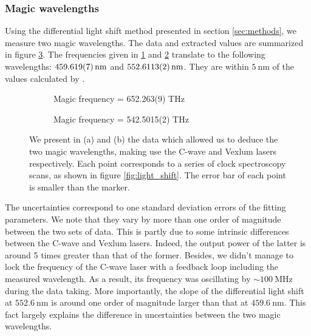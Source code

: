 \documentclass[11pt]{article}
\numberwithin{equation}{section}
\numberwithin{figure}{section}
\begin{document}
\subsubsection{Magic wavelengths}
\label{sec:magic_wavelengths}

Using the differential light shift method presented in section \ref{sec:methods}, we measure two magic wavelengths. The data and extracted values are summarized in figure \ref{fig:magic}. The frequencies given in \ref{fig:magic_1} and \ref{fig:magic_2} translate to the following wavelengths: $\SI{459.619\pm0.007}{\nano\metre}$ and $\SI{552.6113\pm0.0002}{\nano\metre}$. They are within $\SI{5}{\nano\metre}$ of the values calculated by \cite{2010_dzuba}.

%
\begin{figure}[htb]
	\centering
	\begin{subfigure}[b]{0.49\textwidth}
		\centering
    	\small
   		
		\caption{\small Magic frequency = 652.263(9) THz}
		\label{fig:magic_1}
	\end{subfigure}
	\begin{subfigure}[b]{0.49\textwidth}
    	\centering
    	\small
   		
		\caption{\small Magic frequency = 542.5015(2) THz}
		\label{fig:magic_2}
	\end{subfigure}	
	\caption{\small We present in (a) and (b) the data which allowed us to deduce the two magic wavelengths, making use the C-wave and Vexlum lasers respectively. Each point corresponds to a series of clock spectroscopy scans, as shown in figure \ref{fig:light_shift}. The error bar of each point is smaller than the marker.}
    \label{fig:magic}
\end{figure}
%

The uncertainties correspond to one standard deviation errors of the fitting parameters. We note that they vary by more than one order of magnitude between the two sets of data. This is partly due to some intrinsic differences between the C-wave and Vexlum lasers. Indeed, the output power of the latter is around 5 times greater than that of the former. Besides, we didn't manage to lock the frequency of the C-wave laser with a feedback loop including the measured wavelength. As a result, its frequency was oscillating by $\sim \SI{100}{\mega\hertz}$ during the data taking. More importantly, the slope of the differential light shift at $\SI{552.6}{\nano\metre}$ is around one order of magnitude larger than that at $\SI{459.6}{\nano\metre}$. This fact largely explains the difference in uncertainties between the two magic wavelengths.
\end{document}
